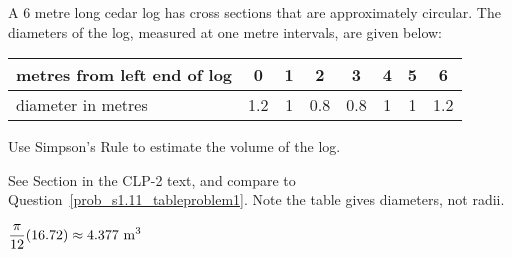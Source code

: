 \begin{question}[1996D]\label{prob_s1.11tableproblem2}
A $6$ metre long cedar log has cross sections that are approximately
circular. The diameters of the log, measured at one metre intervals, are
given below:

\renewcommand{\arraystretch}{1.1}
\begin{center}
     \begin{tabular}{|l|c|c|c|c|c|c|c|}
          \hline
          metres from left end of log&0&1&2&3&4&5&6  \\
          \hline
          diameter in metres         &1.2&1&0.8&0.8&1&1&1.2 \\
          \hline
     \end{tabular}
\end{center}
\renewcommand{\arraystretch}{1.0}

\noindent Use Simpson's Rule to estimate the volume of the log.

\end{question}

\begin{hint}
See Section  in the
CLP-2 text, and compare to Question~\ref{prob_s1.11_tableproblem1}. Note the table gives diameters, not radii.
\end{hint}

\begin{answer}
$\displaystyle\frac{\pi}{12}(16.72)\approx4.377\ {\rm m}^3$
\end{answer}

